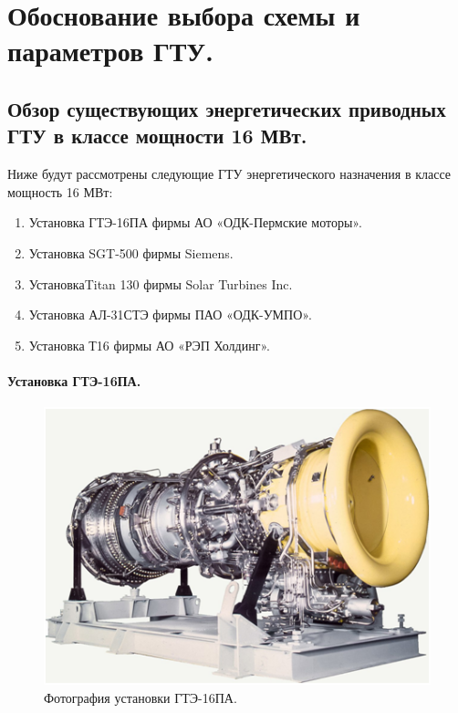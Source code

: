 \documentclass[a4paper,12pt]{article}
\begin{document}
    \newpage

    \section{Обоснование выбора схемы и параметров ГТУ.}

    \subsection{Обзор существующих энергетических приводных ГТУ в классе мощности 16 МВт.}

     Ниже будут рассмотрены следующие ГТУ энергетического назначения в классе мощность 16 МВт:
    \begin{enumerate}
        \item Установка ГТЭ-16ПА фирмы АО «ОДК-Пермские моторы».
        \item Установка SGT-500 фирмы Siemens.
        \item УстановкаTitan 130 фирмы Solar Turbines Inc.
        \item Установка АЛ-31СТЭ фирмы ПАО «ОДК-УМПО».
        \item Установка Т16 фирмы АО «РЭП Холдинг».
    \end{enumerate}

    \paragraph{Установка ГТЭ-16ПА.}

    \begin{figure}[h!]
        \centering
        \includegraphics[scale=1]{./pictures/GTE-16PA.png}
        \caption{Фотография установки ГТЭ-16ПА.}
        \label{pic_gte_16pa}
    \end{figure}
\end{document}
